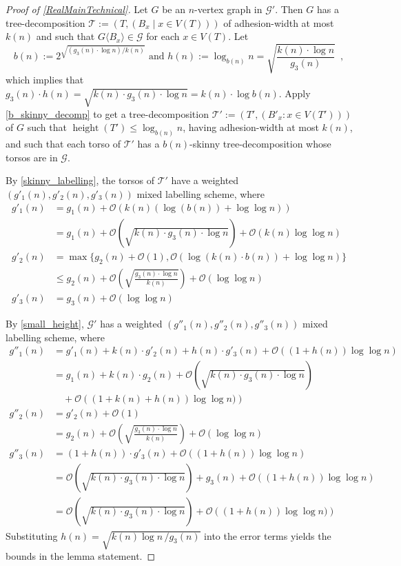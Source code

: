 \documentclass{patmorin}
\renewcommand{\le}{\leqslant}
\newcommand{\torso}[2]{{#1}\langle{#2}\rangle}
\DeclareMathOperator{\height}{height}
\newcommand{\Oh}{\mathcal{O}}
\begin{document}
  \begin{proof}[Proof of \cref{RealMainTechnical}]
    Let $G$ be an $n$-vertex graph in $\mathcal{G}'$.
    Then $G$ has a tree-decomposition $\mathcal{T}:=(T,(B_x\mid x\in V(T)))$ of adhesion-width at most $k(n)$ and such that $\torso{G}{B_x}\in\mathcal{G}$ for each $x\in V(T)$.
    Let
    \[
      b(n) :=2^{\sqrt{(g_3(n)\cdot\log n)/k(n)}} \text{ and }
      h(n):=\log_{b(n)} n = \sqrt{\frac{k(n)\cdot \log n}{g_3(n)}} \enspace ,
    \]
    which implies that $g_3(n)\cdot h(n)=\sqrt{k(n)\cdot g_3(n)\cdot\log n}=k(n)\cdot \log b(n)$.
    Apply \cref{b_skinny_decomp} to get a tree-decomposition $\mathcal{T}':=(T',(B'_x:x\in V(T')))$ of $G$ such that $\height(T')\le\log_{b(n)} n$, having adhesion-width at most $k(n)$, and such that each torso of $\mathcal{T}'$ has a $b(n)$-skinny tree-decomposition whose torsos are in $\mathcal{G}$.

    By \cref{skinny_labelling}, the torsos of $\mathcal{T}'$ have a weighted $(g'_1(n),g'_2(n),g'_3(n))$ mixed labelling scheme, where
    \begin{align*}
     g'_1(n) & = g_1(n) + \Oh(k(n)(\log(b(n)) + \log\log n)) \\
     & = g_1(n) + \Oh\left(\sqrt{k(n)\cdot g_3(n)\cdot \log n}\right) + \Oh(k(n)\log\log n) \\
     g'_2(n) & = \max\{g_2(n)+\Oh(1), \Oh(\log(k(n)\cdot b(n))+\log\log n)\} \\
          & \le g_2(n) + \Oh\left(\sqrt{\frac{g_3(n)\cdot \log n}{k(n)}}\right) + \Oh(\log\log n) \\
     g'_3(n) & = g_3(n) + \Oh(\log\log n)
    \end{align*}

    By \cref{small_height}, $\mathcal{G}'$ has a weighted $(g''_1(n),g''_2(n),g''_3(n))$ mixed labelling scheme, where
    \begin{align*}
     g''_1(n) & = g'_1(n) + k(n)\cdot g'_2(n) + h(n)\cdot g'_3(n) + \Oh((1+h(n))\log\log n) \\
       & = g_1(n) + k(n)\cdot g_2(n) + \Oh\left(\sqrt{k(n)\cdot g_3(n)\cdot \log n}\right) \\
       & \quad {} + \Oh\left((1+k(n)+h(n))\log\log n)\right) \\
     g''_2(n) & = g'_2(n) + \Oh(1) \\
       & = g_2(n) + \Oh\left(\sqrt{\frac{g_3(n)\cdot \log n}{k(n)}}\right) + \Oh(\log\log n) \\
     g''_3(n) & = (1+h(n))\cdot g'_3(n) + \Oh((1+h(n))\log\log n) \\
       & = \Oh\left(\sqrt{k(n)\cdot g_3(n)\cdot \log n}\right) + g_3(n) + \Oh\left((1+h(n))\log\log n\right) \\
       & = \Oh\left(\sqrt{k(n)\cdot g_3(n)\cdot \log n}\right) + \Oh\left((1+h(n))\log\log n)\right)
   \end{align*}
   Substituting $h(n) = \sqrt{k(n)\log n\, / g_3(n)}$ into the error terms yields the bounds in the lemma statement.
  \end{proof}
\end{document}
